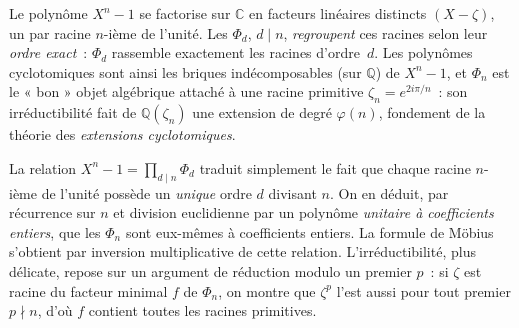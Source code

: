 \begin{significationintuitive}
Le polynôme $X^n-1$ se factorise sur $\mathbb{C}$ en facteurs linéaires
distincts $(X-\zeta)$, un par racine $n$-ième de l'unité. Les $\Phi_d$,
$d\mid n$, \emph{regroupent} ces racines selon leur \emph{ordre exact}~:
$\Phi_d$ rassemble exactement les racines d'ordre~$d$. Les polynômes
cyclotomiques sont ainsi les briques indécomposables (sur $\mathbb{Q}$) de
$X^n-1$, et $\Phi_n$ est le « bon » objet algébrique attaché à une racine
primitive $\zeta_n=e^{2i\pi/n}$~: son
irréductibilité fait de $\mathbb{Q}(\zeta_n)$ une extension de degré
$\varphi(n)$, fondement de la théorie des \emph{extensions cyclotomiques}.
\end{significationintuitive}

\decsep{}


\begin{ideepreuve}
La relation $X^n-1=\prod_{d\mid n}\Phi_d$ traduit simplement le fait que
chaque racine $n$-ième de l'unité possède un \emph{unique} ordre $d$ divisant
$n$. On en déduit, par récurrence sur $n$ et division euclidienne par un
polynôme \emph{unitaire à coefficients entiers}, que les $\Phi_n$ sont eux-mêmes
à coefficients entiers. La formule de Möbius s'obtient par inversion
multiplicative de cette relation. L'irréductibilité, plus délicate, repose sur
un argument de réduction modulo un premier $p$~: si $\zeta$ est racine du
facteur minimal $f$ de $\Phi_n$, on montre que $\zeta^p$ l'est aussi pour tout
premier $p\nmid n$, d'où $f$ contient toutes les racines primitives.
\end{ideepreuve}

\vspace{10pt}

